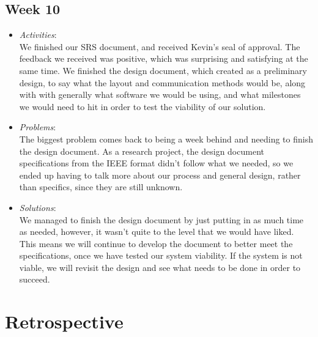 \documentclass[compsoc,draftclsnofoot,onecolumn,10pt]{IEEEtran}
\begin{document}
\subsection{Week 10}
	\begin{itemize}
        \item \textit{Activities}:\\
        We finished our SRS document, and received Kevin's seal of approval. 
        The feedback we received was positive, which was surprising and satisfying at the same time. 
        We finished the design document, which created as a preliminary design, to say what the layout and communication methods would be, along with with generally what software we would be using, and what milestones we would need to hit in order to test the viability of our solution. 
        
        \item \textit{Problems}:\\
        The biggest problem comes back to being a week behind and needing to finish the design document. 
        As a research project, the design document specifications from the IEEE format didn't follow what we needed, so we ended up having to talk more about our process and general design, rather than specifics, since they are still unknown. 
        
        \item \textit{Solutions}:\\
       	We managed to finish the design document by just putting in as much time as needed, however, it wasn't quite to the level that we would have liked. 
	This means we will continue to develop the document to better meet the specifications, once we have tested our system viability. 
	If the system is not viable, we will revisit the design and see what needs to be done in order to succeed. 
	\end{itemize}
   
\section{Retrospective}

    
\end{document}
